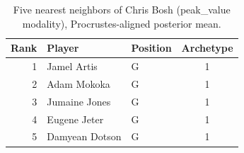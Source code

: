 \begin{table}[htbp]
  \centering\small
  \begin{tabular}{rllc}
    \toprule
    Rank & Player & Position & Archetype \\
    \midrule
    1 & Jamel Artis & G & 1 \\
    2 & Adam Mokoka & G & 1 \\
    3 & Jumaine Jones & G & 1 \\
    4 & Eugene Jeter & G & 1 \\
    5 & Damyean Dotson & G & 1 \\
    \bottomrule
  \end{tabular}
  \caption{Five nearest neighbors of Chris Bosh (peak_value modality), Procrustes-aligned posterior mean.}
  \label{tab:Chris_Bosh_neighbors_peak_value}
\end{table}

